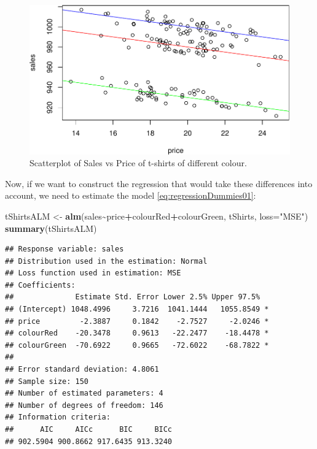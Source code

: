 \documentclass[
]{book}
\newenvironment{Shaded}{\begin{snugshade}}{\end{snugshade}}
\newcommand{\AttributeTok}[1]{\textcolor[rgb]{0.13,0.29,0.53}{#1}}
\newcommand{\FunctionTok}[1]{\textcolor[rgb]{0.13,0.29,0.53}{\textbf{#1}}}
\newcommand{\NormalTok}[1]{#1}
\newcommand{\OtherTok}[1]{\textcolor[rgb]{0.56,0.35,0.01}{#1}}
\newcommand{\SpecialCharTok}[1]{\textcolor[rgb]{0.81,0.36,0.00}{\textbf{#1}}}
\newcommand{\StringTok}[1]{\textcolor[rgb]{0.31,0.60,0.02}{#1}}
\theoremstyle{definition}
\theoremstyle{definition}
\theoremstyle{definition}
\theoremstyle{definition}
\theoremstyle{remark}
\begin{document}
\begin{figure}
\centering
\includegraphics{Svetunkov---Statistics-for-Business-Analytics_files/figure-latex/tShirtsScatterPlot-1.pdf}
\caption{\label{fig:tShirtsScatterPlot}Scatterplot of Sales vs Price of t-shirts of different colour.}
\end{figure}

Now, if we want to construct the regression that would take these differences into account, we need to estimate the model \eqref{eq:regressionDummies01}:

\begin{Shaded}
\begin{Highlighting}[]
\NormalTok{tShirtsALM }\OtherTok{\textless{}{-}} \FunctionTok{alm}\NormalTok{(sales}\SpecialCharTok{\textasciitilde{}}\NormalTok{price}\SpecialCharTok{+}\NormalTok{colourRed}\SpecialCharTok{+}\NormalTok{colourGreen, tShirts, }\AttributeTok{loss=}\StringTok{"MSE"}\NormalTok{)}
\FunctionTok{summary}\NormalTok{(tShirtsALM)}
\end{Highlighting}
\end{Shaded}

\begin{verbatim}
## Response variable: sales
## Distribution used in the estimation: Normal
## Loss function used in estimation: MSE
## Coefficients:
##              Estimate Std. Error Lower 2.5% Upper 97.5%  
## (Intercept) 1048.4996     3.7216  1041.1444   1055.8549 *
## price         -2.3887     0.1842    -2.7527     -2.0246 *
## colourRed    -20.3478     0.9613   -22.2477    -18.4478 *
## colourGreen  -70.6922     0.9665   -72.6022    -68.7822 *
## 
## Error standard deviation: 4.8061
## Sample size: 150
## Number of estimated parameters: 4
## Number of degrees of freedom: 146
## Information criteria:
##      AIC     AICc      BIC     BICc 
## 902.5904 900.8662 917.6435 913.3240
\end{verbatim}
\end{document}
